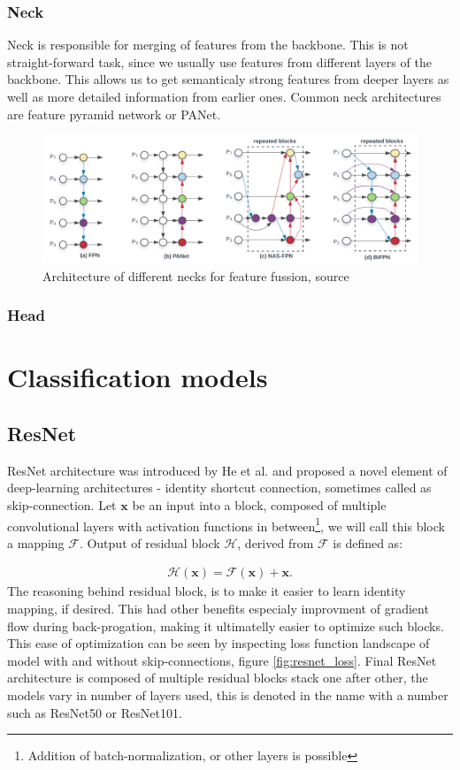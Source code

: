 \subsubsection{Neck}
Neck is responsible for merging of features from the backbone. This is not straight-forward task, since we usually use features from different layers of the backbone. This allows us to get semanticaly strong features from deeper layers as well as more detailed information from earlier ones. Common neck architectures are feature pyramid network or PANet.
\begin{figure}
    \centering
    \includegraphics[width=\linewidth]{images/necks_architecture.png}
    \caption{Architecture of different necks for feature fussion, source \cite{Tan2019}}
    \label{fig:necks}
\end{figure}

\subsubsection{Head}

\section{Classification models}
\subsection{ResNet}
ResNet architecture was introduced by He et al. \cite{He2015} and proposed a novel element of deep-learning architectures - identity shortcut connection, sometimes called as skip-connection. Let $\mathbf{x}$ be an input into a block, composed of multiple convolutional layers with activation functions in between\footnote{Addition of batch-normalization, or other layers is possible}, we will call this block a mapping $\mathcal{F}$. Output of residual block $\mathcal{H}$, derived from $\mathcal{F}$ is defined as:

\begin{align}
    \mathcal{H}\left(\mathbf{x}\right) = \mathcal{F} \left(\mathbf{x}\right) + \mathbf{x}.
\end{align}
The reasoning behind residual block, is to make it easier to learn identity mapping, if desired. This had other benefits especialy improvment of gradient flow during back-progation, making it ultimatelly easier to optimize such blocks. This ease of optimization can be seen by inspecting loss function landscape of model with and without skip-connections, figure \ref{fig:resnet_loss}.
Final ResNet architecture is composed of multiple residual blocks stack one after other, the models vary in number of layers used, this is denoted in the name with a number such as ResNet50 or ResNet101.

